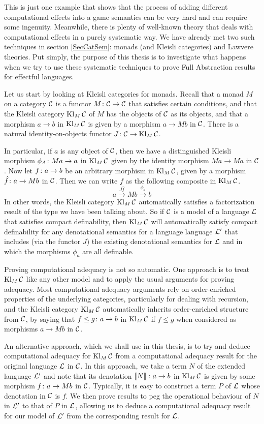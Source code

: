This is just one example that shows that the process of adding different computational effects into a game semantics can be very hard and can require some ingenuity.
Meanwhile, there is plenty of well-known theory that deals with computational effects in a purely systematic way.  
We have already met two such techniques in section \ref{SecCatSem}: monads (and Kleisli categories) and Lawvere theories.
Put simply, the purpose of this thesis is to investigate what happens when we try to use these systematic techniques to prove Full Abstraction results for effectful languages.

Let us start by looking at Kleisli categories for monads.  
Recall that a monad $M$ on a category ${\mathcal{C}}$ is a functor $M \colon {\mathcal{C}} \to {\mathcal{C}}$ that satisfies certain conditions, and that the Kleisli category $\operatorname{Kl}_M{\mathcal{C}}$ of $M$ has the objects of ${\mathcal{C}}$ as its objects, and that a morphism $a \to b$ in $\operatorname{Kl}_M{\mathcal{C}}$ is given by a morphism $a \to Mb$ in ${\mathcal{C}}$.
There is a natural identity-on-objects functor $J\colon {\mathcal{C}} \to \operatorname{Kl}_M{\mathcal{C}}$.

In particular, if $a$ is any object of ${\mathcal{C}}$, then we have a distinguished Kleisli morphism $\phi_A\colon Ma \to a$ in $\operatorname{Kl}_M{\mathcal{C}}$ given by the identity morphism $Ma \to Ma$ in ${\mathcal{C}}$.
Now let $f\colon a \to b$ be an arbitrary morphism in $\operatorname{Kl}_M{\mathcal{C}}$, given by a morphism $\hat f\colon a \to Mb$ in ${\mathcal{C}}$.
Then we can write $f$ as the following composite in $\operatorname{Kl}_M{\mathcal{C}}$.
\[
  a \xrightarrow{J\hat{f}} Mb \xrightarrow{\phi_b} b
  \]
In other words, the Kleisli category $\operatorname{Kl}_M{\mathcal{C}}$ automatically satisfies a factorization result of the type we have been talking about.  
So if ${\mathcal{C}}$ is a model of a language $\mathcal L$ that satisfies compact definability, then $\operatorname{Kl}_M{\mathcal{C}}$ will automatically satisfy compact definability for any denotational semantics for a language language $\mathcal L'$ that includes (via the functor $J$) the existing denotational semantics for $\mathcal L$ and in which the morphisms $\phi_a$ are all definable.

Proving computational adequacy is not so automatic.  
One approach is to treat $\operatorname{Kl}_M{\mathcal{C}}$ like any other model and to apply the usual arguments for proving adequacy.  
Most computational adequacy arguments rely on order-enriched properties of the underlying categories, particularly for dealing with recursion, and the Kleisli category $\operatorname{Kl}_M{\mathcal{C}}$ automatically inherits order-enriched structure from ${\mathcal{C}}$, by saying that $f\le g\colon a \to b$ in $\operatorname{Kl}_M{\mathcal{C}}$ if $f\le g$ when considered as morphisms $a \to Mb$ in ${\mathcal{C}}$.

An alternative approach, which we shall use in this thesis, is to try and deduce computational adequacy for $\operatorname{Kl}_M{\mathcal{C}}$ from a computational adequacy result for the original language $\mathcal L$ in ${\mathcal{C}}$.  
In this approach, we take a term $N$ of the extended language $\mathcal L'$ and note that its denotation $\left\llbracket N\right\rrbracket \colon a \to b$ in $\operatorname{Kl}_M{\mathcal{C}}$ is given by some morphism $f \colon a \to Mb$ in ${\mathcal{C}}$.  
Typically, it is easy to construct a term $P$ of $\mathcal L$ whose denotation in ${\mathcal{C}}$ is $f$.
We then prove results to peg the operational behaviour of $N$ in $\mathcal L'$ to that of $P$ in $\mathcal L$, allowing us to deduce a computational adequacy result for our model of $\mathcal L'$ from the corresponding result for $\mathcal L$.

